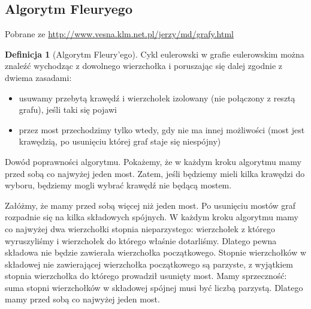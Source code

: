 \documentclass[a4paper,12pt]{article}
\theoremstyle{definition}%
\theoremstyle{definition}
\newtheorem{definition}{Definicja}%
\theoremstyle{problem}
\begin{document}
\subsection{Algorytm Fleuryego}
Pobrane ze \url{http://www.vesna.klm.net.pl/jerzy/md/grafy.html}\\
\begin{definition}[Algorytm Fleury'ego]
Cykl eulerowski w grafie eulerowskim można znaleźć wychodząc z dowolnego wierzchołka i poruszając się dalej zgodnie z dwiema zasadami:
\begin{itemize}
\item usuwamy przebytą krawędź i wierzchołek izolowany (nie połączony z resztą grafu), jeśli taki się pojawi
\item przez most przechodzimy tylko wtedy, gdy nie ma innej możliwości (most jest krawędzią, po usunięciu której graf staje się niespójny)
\end{itemize}

Dowód poprawności algorytmu. Pokażemy, że w każdym kroku algorytmu mamy przed sobą co najwyżej jeden most. Zatem, jeśli będziemy mieli kilka krawędzi do wyboru, będziemy mogli wybrać krawędź nie będącą mostem.


Załóżmy, że mamy przed sobą więcej niż jeden most. Po usunięciu mostów graf rozpadnie się na kilka składowych spójnych. W każdym kroku algorytmu mamy co najwyżej dwa wierzchołki stopnia nieparzystego: wierzchołek z którego wyruszyliśmy i wierzchołek do którego właśnie dotarliśmy. Dlatego pewna składowa nie będzie zawierała wierzchołka początkowego. Stopnie wierzchołków w składowej nie zawierającej wierzchołka początkowego są parzyste, z wyjątkiem stopnia wierzchołka do którego prowadził usunięty most. Mamy sprzeczność: suma stopni wierzchołków w składowej spójnej musi być liczbą parzystą. Dlatego mamy przed sobą co najwyżej jeden most.
\end{definition}
\end{document}
